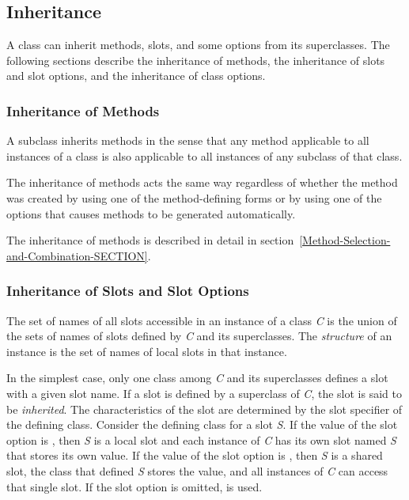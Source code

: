 
\subsection{Inheritance}
\label{Inheritance-SECTION}

A class can inherit methods, slots, and some  options
from its superclasses.  The following sections describe the inheritance of
methods, the inheritance of slots and slot options, and the inheritance of
class options.
 
\subsubsection{Inheritance of Methods}
\label{Inheritance-of-Methods-SECTION}

A subclass inherits methods in the sense that any method applicable to
all instances of a class is also applicable to all instances of any
subclass of that class.

The inheritance of methods acts the same way regardless of whether the
method was created by using one of the method-defining forms or by
using one of the  options that causes methods to be
generated automatically.

The inheritance of methods is described in detail in
section~\ref{Method-Selection-and-Combination-SECTION}.


\subsubsection{Inheritance of Slots and Slot Options}
\label{Inheritance-of-Slots-and-Slot-Options-SECTION}

The set of names of all slots accessible in an instance of a class
\emph{C} is the union of the sets of names of slots defined by \emph{C} and its
superclasses. The \emph{structure} of an instance is the set of names
of local slots in that instance.

In the simplest case, only one class among \emph{C} and its superclasses
defines a slot with a given slot name.  If a slot is defined by a
superclass of \emph{C}, the slot is said to be \emph{inherited}.  The
characteristics of the slot are determined by the 
slot specifier of the defining class.  Consider the defining class for
a slot \emph{S}.  If the value of the  slot
option is , then \emph{S} is a local slot and each instance
of \emph{C} has its own slot named \emph{S} that stores its own value.  If the
value of the  slot option is , then \emph{S}
is a shared slot, the class that defined \emph{S} stores the value, and all
instances of \emph{C} can access that single slot.  If the 
 slot option is omitted,  is used.


